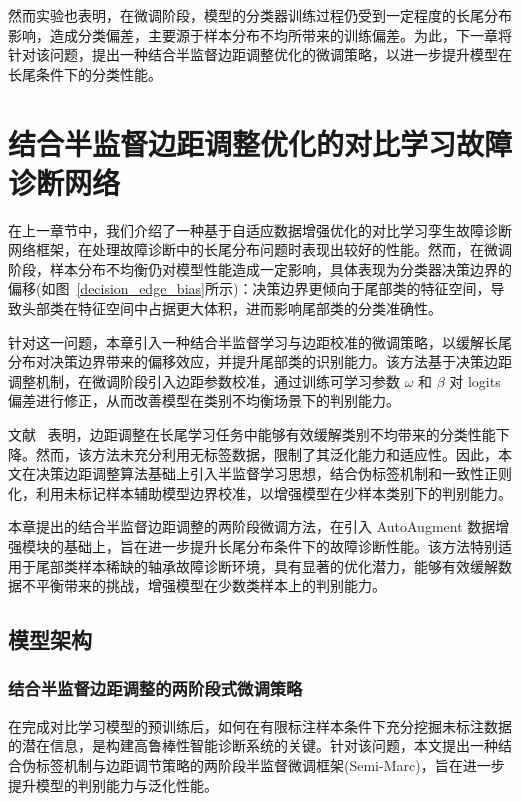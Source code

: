 \documentclass[master]{thesis-uestc}
\begin{document}
然而实验也表明，在微调阶段，模型的分类器训练过程仍受到一定程度的长尾分布影响，造成分类偏差，主要源于样本分布不均所带来的训练偏差。为此，下一章将针对该问题，提出一种结合半监督边距调整优化的微调策略，以进一步提升模型在长尾条件下的分类性能。

\chapter{结合半监督边距调整优化的对比学习故障诊断网络}

在上一章节中，我们介绍了一种基于自适应数据增强优化的对比学习孪生故障诊断网络框架，在处理故障诊断中的长尾分布问题时表现出较好的性能。然而，在微调阶段，样本分布不均衡仍对模型性能造成一定影响，具体表现为分类器决策边界的偏移(如图~\ref{decision_edge_bias}所示)：决策边界更倾向于尾部类的特征空间，导致头部类在特征空间中占据更大体积，进而影响尾部类的分类准确性。

针对这一问题，本章引入一种结合半监督学习与边距校准的微调策略，以缓解长尾分布对决策边界带来的偏移效应，并提升尾部类的识别能力。该方法基于决策边距调整机制，在微调阶段引入边距参数校准，通过训练可学习参数 $\omega$ 和 $\beta$ 对 logits 偏差进行修正，从而改善模型在类别不均衡场景下的判别能力。

文献~\cite{wang2023margin} 表明，边距调整在长尾学习任务中能够有效缓解类别不均带来的分类性能下降。然而，该方法未充分利用无标签数据，限制了其泛化能力和适应性。因此，本文在决策边距调整算法基础上引入半监督学习思想，结合伪标签机制和一致性正则化，利用未标记样本辅助模型边界校准，以增强模型在少样本类别下的判别能力。

本章提出的结合半监督边距调整的两阶段微调方法，在引入 AutoAugment 数据增强模块的基础上，旨在进一步提升长尾分布条件下的故障诊断性能。该方法特别适用于尾部类样本稀缺的轴承故障诊断环境，具有显著的优化潜力，能够有效缓解数据不平衡带来的挑战，增强模型在少数类样本上的判别能力。

\section{模型架构}

\subsection{结合半监督边距调整的两阶段式微调策略}

在完成对比学习模型的预训练后，如何在有限标注样本条件下充分挖掘未标注数据的潜在信息，是构建高鲁棒性智能诊断系统的关键。针对该问题，本文提出一种结合伪标签机制与边距调节策略的两阶段半监督微调框架(Semi-Marc)，旨在进一步提升模型的判别能力与泛化性能。
\end{document}

